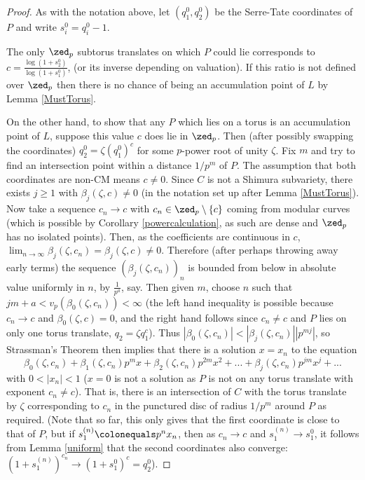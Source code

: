 \documentclass[12pt,letterpaper]{article}
\begin{document}
	
	\begin{proof}
		As with the notation above, let $(q_1^0,q_2^0)$ be the Serre-Tate coordinates of $P$ and write $s_i^0 = q_i^0-1$.
		
		The only $\zed_p$ subtorus translates on which $P$ could lie corresponds to $c = \frac{\log({1+s_2^0})}{\log({1+s_1^0})}$, (or its inverse depending on valuation). If this ratio is not defined over $\zed_p$ then there is no chance of being an accumulation point of $L$ by Lemma \ref{MustTorus}.
		
		On the other hand, to show that any $P$ which lies on a torus is an accumulation point of $L$, suppose this value $c$ does lie in $\zed_p$. Then (after possibly swapping the coordinates) $q_2^0 = \zeta(q_1^0)^c$ for some $p$-power root of unity $\zeta$. Fix $m$ and try to find an intersection point within a distance $1/p^m$ of $P$. The assumption that both coordinates are non-CM means $c\ne0$. Since $C$ is not a Shimura subvariety, there exists $j\geq1$ with $\beta_j(\zeta,c)\ne0$ (in the notation set up after Lemma \ref{MustTorus}). Now take a sequence $c_n\to c$ with $c_n\in \zed_p\setminus\{c\}$ coming from modular curves (which is possible by Corollary \ref{powercalculation}, as such are dense and $\zed_p$ has no isolated points). Then, as the coefficients are continuous in $c$, $\lim_{n\to\infty}\beta_j(\zeta,c_n)= \beta_j(\zeta,c)\ne0 $. Therefore (after perhaps throwing away early terms) the sequence $(\beta_j(\zeta,c_n))_n$ is bounded from below in absolute value uniformly in $n$, by $\frac{1}{p^a}$, say. Then given $m$, choose $n$ such that $jm+a<v_p(\beta_0(\zeta,c_n))<\infty$ (the left hand inequality is possible because $c_n\to c$ and $\beta_0(\zeta,c)=0$, and the right hand follows since $c_n\ne c$ and $P$ lies on only one torus translate, $q_2= \zeta q_1^c$). Thus $|\beta_0(\zeta,c_n)|<|\beta_j(\zeta,c_n)||p^{mj}|$, so Strassman's Theorem then implies that there is a solution $x=x_n$ to the equation 		
		\[\beta_0(\zeta,c_n)+\beta_1(\zeta,c_n)p^mx + \beta_2(\zeta,c_n)p^{2m}x^2 + ... +\beta_j(\zeta,c_n)p^{jm}x^j+... \]		
		with $0<|x_n|<1$ ($x=0$ is not a solution as $P$ is not on any torus translate with exponent $c_n\ne c$). That is, there is an intersection of $C$ with the torus translate by $\zeta$ corresponding to $c_n$ in the punctured disc of radius $1/p^m$ around $P$ as required. (Note that so far, this only gives that the first coordinate is close to that of $P$, but if $s_1^{(n)}\colonequals p^nx_n$, then as $c_n\to c$ and $s_1^{(n)}\to s_1^0$, it follows from Lemma \ref{uniform} that the second coordinates also converge: $(1+s_1^{(n)})^{c_n}\to (1+s_1^0)^c= q_2^0$).
	\end{proof}
	
\end{document}
